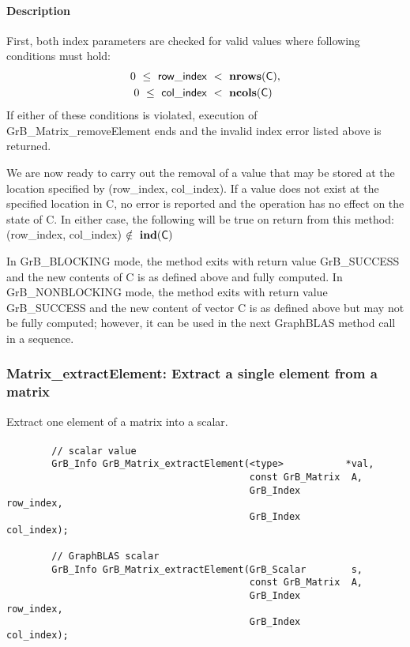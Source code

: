 \paragraph{Description}

First, both index parameters are checked for valid values where following
conditions must hold:
\[
\begin{aligned}
    0\ \leq\ {\sf row\_index} & \ <\ \mathbf{nrows}({\sf C}), \\
    0\ \leq\ {\sf col\_index} & \ <\ \mathbf{ncols}({\sf C})
\end{aligned}
\]
If either of these conditions is violated, execution of 
{\sf GrB\_Matrix\_removeElement} ends and the invalid 
index error listed above is returned. 

We are now ready to carry out the removal of a value that may be stored at the
location specified by ({\sf row\_index}, {\sf col\_index}).  If a value does not
exist at the specified location in {\sf C}, no error is reported and the 
operation has no effect on the state of {\sf C}.  In either case, the following 
will be true on return from this method: 
({\sf row\_index}, {\sf col\_index}) $\notin~\mathbf{ind}({\sf C})$

In {\sf GrB\_BLOCKING} mode, the method exits with return value 
{\sf GrB\_SUCCESS} and the new contents of {\sf C} is as defined above
and fully computed.  
In {\sf GrB\_NONBLOCKING} mode, the method exits with return value 
{\sf GrB\_SUCCESS} and the new content of vector {\sf C} is as defined above 
but may not be fully computed; however, it can be used in the next GraphBLAS 
method call in a sequence.



\subsubsection{{\sf Matrix\_extractElement}: Extract a single element from a matrix}
\label{Sec:Matrix_extractElement}
\label{Sec:extract_single_element_mat}

Extract one element of a matrix into a scalar. 

\paragraph{\syntax}

\begin{verbatim}
        // scalar value
        GrB_Info GrB_Matrix_extractElement(<type>           *val,
                                           const GrB_Matrix  A,
                                           GrB_Index         row_index,
                                           GrB_Index         col_index);

        // GraphBLAS scalar
        GrB_Info GrB_Matrix_extractElement(GrB_Scalar        s,
                                           const GrB_Matrix  A,
                                           GrB_Index         row_index,
                                           GrB_Index         col_index); 

\end{verbatim}

